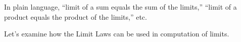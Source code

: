 \documentclass{ximera}
\begin{document}
In plain language, ``limit of a sum equals the sum of the limits,'' ``limit of a product equals the product of the limits,'' etc.

Let's examine how the Limit Laws can be used in computation of limits.
%
\end{document}
